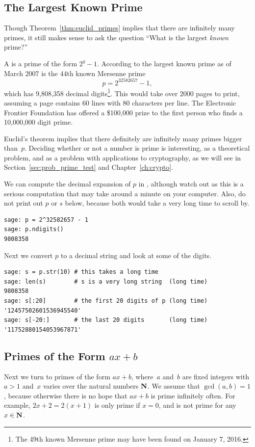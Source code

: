 \subsection{The Largest Known Prime}\label{sec:largest}
Though Theorem~\ref{thm:euclid_primes} implies that there are infinitely
many primes, it still makes sense to ask the question
``What is the largest {\em known} prime?''

A  is a prime of the form $2^q-1$.
According to \cite{caldwell:largestprime} the largest known prime
as of March 2007 is the 44th known Mersenne prime
$$
  p = 2^{32582657}-1,
$$
which has 9,808,358 decimal
digits\footnote{The 49th known Mersenne prime may
have been found on January 7, 2016.}.
This would take over 2000 pages to
print, assuming a page contains 60 lines with 80 characters per line.
The Electronic Frontier Foundation has offered a \$100,000 prize to
the first person who finds a 10,000,000 digit prime.

Euclid's theorem implies that there definitely are infinitely
many primes bigger than~$p$.
Deciding whether or not a number is prime is
interesting, as a theoretical problem,
and as a problem with
applications to cryptography, as we will see in
Section~\ref{sec:prob_prime_test} and Chapter~\ref{ch:crypto}.

\begin{sg}
We can compute the decimal expansion of $p$ in \sage, although
watch out as this is a serious computation that may take
around a minute on your computer.  Also, do not print
out $p$ or $s$ below, because both would take a very
long time to  scroll by.
\begin{verbatim}
sage: p = 2^32582657 - 1
sage: p.ndigits()
9808358
\end{verbatim}%
\noindent{}Next we convert $p$ to a decimal string and look at some of the digits.
\begin{verbatim}
sage: s = p.str(10) # this takes a long time
sage: len(s)        # s is a very long string  (long time)
9808358
sage: s[:20]        # the first 20 digits of p (long time)
'12457502601536945540'
sage: s[-20:]       # the last 20 digits       (long time)
'11752880154053967871'
\end{verbatim}
\end{sg}


\subsection{Primes of the Form $ax+b$}
Next we turn to primes of the form $ax+b$, where~$a$ and~$b$ are
fixed integers with $a>1$ and~$x$ varies over the natural numbers $\mathbf{N}$.
We assume that $\gcd(a,b)=1$, because otherwise there is no
hope that $ax+b$ is prime infinitely often.
For example, $2x+2=2(x+1)$ is only prime if $x=0$, and is
not prime for any $x\in\mathbf{N}$.

